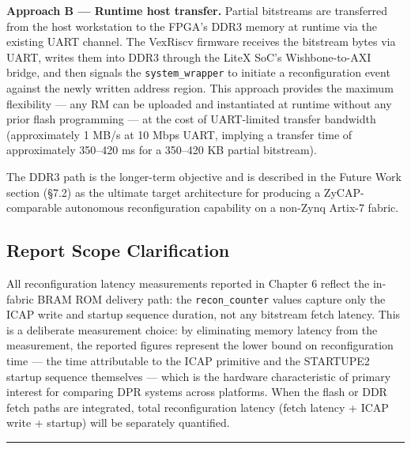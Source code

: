 \textbf{Approach B — Runtime host transfer.} Partial bitstreams are transferred from the host workstation to the FPGA's DDR3 memory at runtime via the existing UART channel. The VexRiscv firmware receives the bitstream bytes via UART, writes them into DDR3 through the LiteX SoC's Wishbone-to-AXI bridge, and then signals the \texttt{system\_wrapper} to initiate a reconfiguration event against the newly written address region. This approach provides the maximum flexibility — any RM can be uploaded and instantiated at runtime without any prior flash programming — at the cost of UART-limited transfer bandwidth (approximately 1 MB/s at 10 Mbps UART, implying a transfer time of approximately 350–420 ms for a 350–420 KB partial bitstream).

The DDR3 path is the longer-term objective and is described in the Future Work section (§7.2) as the ultimate target architecture for producing a ZyCAP-comparable autonomous reconfiguration capability on a non-Zynq Artix-7 fabric.

\subsection{Report Scope Clarification}

All reconfiguration latency measurements reported in Chapter 6 reflect the in-fabric BRAM ROM delivery path: the \texttt{recon\_counter} values capture only the ICAP write and startup sequence duration, not any bitstream fetch latency. This is a deliberate measurement choice: by eliminating memory latency from the measurement, the reported figures represent the lower bound on reconfiguration time — the time attributable to the ICAP primitive and the STARTUPE2 startup sequence themselves — which is the hardware characteristic of primary interest for comparing DPR systems across platforms. When the flash or DDR fetch paths are integrated, total reconfiguration latency (fetch latency + ICAP write + startup) will be separately quantified.

\vspace{0.4em}\hrule\vspace{0.4em}
